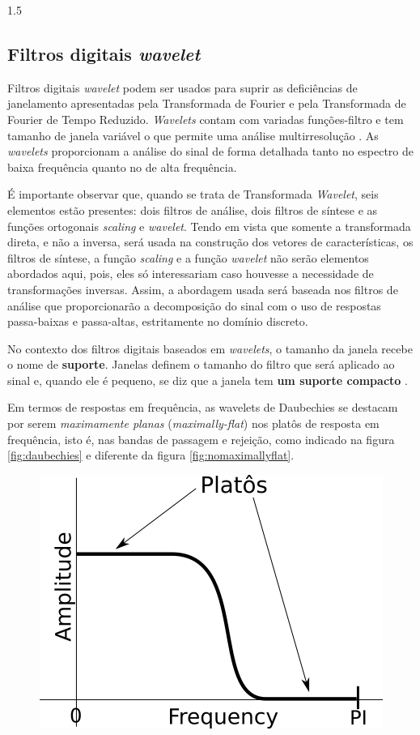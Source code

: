 \documentclass[a4paper,12pt,openright,oneside]{book}
\newenvironment{myenv}[1]
{\begin{spacing}{#1}}
	{\end{spacing}}
\begin{document}
\begin{myenv}{1.5}
\subsection{Filtros digitais \textit{wavelet}}
\par Filtros digitais \textit{wavelet} podem ser usados para suprir as deficiências de janelamento apresentadas pela Transformada de Fourier e pela Transformada de Fourier de Tempo Reduzido. \textit{Wavelets} contam com variadas funções-filtro e tem tamanho de janela variável o que permite uma análise multirresolução \cite{Rod5254905}. As \textit{wavelets} proporcionam a análise do sinal de forma detalhada tanto no espectro de baixa frequência quanto no de alta frequência.
\\
\par É importante observar que, quando se trata de Transformada \textit{Wavelet}, seis elementos estão presentes: dois filtros de análise, dois filtros de síntese e as funções ortogonais \textit{scaling} e \textit{wavelet}. Tendo em vista que somente a transformada direta, e não a inversa, será usada na construção dos vetores de características, os filtros de síntese, a função \textit{scaling} e a função \textit{wavelet} não serão elementos abordados aqui, pois, eles só interessariam caso houvesse a necessidade de transformações inversas. Assim, a abordagem usada será baseada nos filtros de análise que proporcionarão a decomposição do sinal com o uso de respostas passa-baixas e passa-altas, estritamente no domínio discreto.
\\
\par No contexto dos filtros digitais baseados em \textit{wavelets}, o tamanho da janela recebe o nome de \textbf{suporte}. Janelas definem o tamanho do filtro que será aplicado ao sinal e, quando ele é pequeno, se diz que a janela tem \textbf{um suporte compacto} \cite{robi2003}.
\\
\par Em termos de respostas em frequência, as wavelets de Daubechies se destacam por serem \textit{maximamente planas} (\textit{maximally-flat}) nos platôs de resposta em frequência, isto é, nas bandas de passagem e rejeição, como indicado na figura \ref{fig:daubechies} e diferente da figura \ref{fig:nomaximallyflat}.
\begin{figure}[H]
\centering
\includegraphics[width=0.3\linewidth]{images/daubechies}

\end{figure}
\end{myenv}
\end{document}
